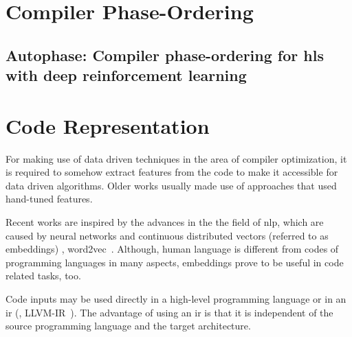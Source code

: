 
\section{Compiler Phase-Ordering}


\subsection*{Autophase: Compiler phase-ordering for hls with deep reinforcement learning}\cite{huang2019autophase}

\section{Code Representation}
For making use of data driven techniques in the area of compiler optimization, it is required to somehow extract features from the code to make it accessible for data driven algorithms.
Older works usually made use of approaches that used hand-tuned features.

Recent works are inspired by the advances in the the field of \ac{nlp}, which are caused by neural networks and continuous distributed vectors (referred to as embeddings) \eg, word2vec~\cite{mikolov2013efficient}. 
Although, human language is different from codes of programming languages in many aspects, embeddings prove to be useful in code related tasks, too.

Code inputs may be used directly in a high-level programming language or in an \ac{ir} (\eg, LLVM-IR~\cite{LLVM:CGO04}).
The advantage of using an \ac{ir} is that it is independent of the source programming language and the target architecture.


